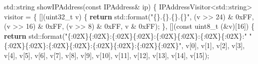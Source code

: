 \documentclass[]{article}
\newenvironment{Shaded}{}{}
\newcommand{\AttributeTok}[1]{\textcolor[rgb]{0.49,0.56,0.16}{#1}}
\newcommand{\BaseNTok}[1]{\textcolor[rgb]{0.25,0.63,0.44}{#1}}
\newcommand{\BuiltInTok}[1]{\textcolor[rgb]{0.00,0.50,0.00}{#1}}
\newcommand{\ControlFlowTok}[1]{\textcolor[rgb]{0.00,0.44,0.13}{\textbf{#1}}}
\newcommand{\DataTypeTok}[1]{\textcolor[rgb]{0.56,0.13,0.00}{#1}}
\newcommand{\DecValTok}[1]{\textcolor[rgb]{0.25,0.63,0.44}{#1}}
\newcommand{\NormalTok}[1]{#1}
\newcommand{\OperatorTok}[1]{\textcolor[rgb]{0.40,0.40,0.40}{#1}}
\newcommand{\SpecialCharTok}[1]{\textcolor[rgb]{0.25,0.44,0.63}{#1}}
\newcommand{\StringTok}[1]{\textcolor[rgb]{0.25,0.44,0.63}{#1}}
\begin{document}
\begin{Shaded}
\begin{Highlighting}[]
\BuiltInTok{std::}\NormalTok{string showIPAddress}\OperatorTok{(}\AttributeTok{const}\NormalTok{ IPAddress}\OperatorTok{\&}\NormalTok{ ip}\OperatorTok{)} \OperatorTok{\{}
\NormalTok{    IPAddressVisitor}\OperatorTok{\textless{}}\BuiltInTok{std::}\NormalTok{string}\OperatorTok{\textgreater{}}\NormalTok{ visitor }\OperatorTok{=} \OperatorTok{\{}
        \OperatorTok{[](}\DataTypeTok{uint32\_t}\NormalTok{ v}\OperatorTok{)} \OperatorTok{\{}
            \ControlFlowTok{return} \BuiltInTok{std::}\NormalTok{format}\OperatorTok{(}\StringTok{"}\SpecialCharTok{\{\}}\StringTok{.}\SpecialCharTok{\{\}}\StringTok{.}\SpecialCharTok{\{\}}\StringTok{.}\SpecialCharTok{\{\}}\StringTok{"}\OperatorTok{,}
                               \OperatorTok{(}\NormalTok{v }\OperatorTok{\textgreater{}\textgreater{}} \DecValTok{24}\OperatorTok{)} \OperatorTok{\&} \BaseNTok{0xFF}\OperatorTok{,} \OperatorTok{(}\NormalTok{v }\OperatorTok{\textgreater{}\textgreater{}} \DecValTok{16}\OperatorTok{)} \OperatorTok{\&} \BaseNTok{0xFF}\OperatorTok{,}
                               \OperatorTok{(}\NormalTok{v }\OperatorTok{\textgreater{}\textgreater{}} \DecValTok{8}\OperatorTok{)} \OperatorTok{\&} \BaseNTok{0xFF}\OperatorTok{,}\NormalTok{ v }\OperatorTok{\&} \BaseNTok{0xFF}\OperatorTok{);}
        \OperatorTok{\},}
        \OperatorTok{[](}\AttributeTok{const} \DataTypeTok{uint8\_t} \OperatorTok{(\&}\NormalTok{v}\OperatorTok{)[}\DecValTok{16}\OperatorTok{])} \OperatorTok{\{}
            \ControlFlowTok{return} \BuiltInTok{std::}\NormalTok{format}\OperatorTok{(}\StringTok{"}\SpecialCharTok{\{:02X\}\{:02X\}}\StringTok{:}\SpecialCharTok{\{:02X\}\{:02X\}}\StringTok{:}\SpecialCharTok{\{:02X\}\{:02X\}}\StringTok{:}\SpecialCharTok{\{:02X\}\{:02X\}}\StringTok{:"}
                               \StringTok{"}\SpecialCharTok{\{:02X\}\{:02X\}}\StringTok{:}\SpecialCharTok{\{:02X\}\{:02X\}}\StringTok{:}\SpecialCharTok{\{:02X\}\{:02X\}}\StringTok{:}\SpecialCharTok{\{:02X\}\{:02X\}}\StringTok{"}\OperatorTok{,}
\NormalTok{                               v}\OperatorTok{[}\DecValTok{0}\OperatorTok{],}\NormalTok{ v}\OperatorTok{[}\DecValTok{1}\OperatorTok{],}\NormalTok{ v}\OperatorTok{[}\DecValTok{2}\OperatorTok{],}\NormalTok{ v}\OperatorTok{[}\DecValTok{3}\OperatorTok{],}\NormalTok{ v}\OperatorTok{[}\DecValTok{4}\OperatorTok{],}\NormalTok{ v}\OperatorTok{[}\DecValTok{5}\OperatorTok{],}\NormalTok{ v}\OperatorTok{[}\DecValTok{6}\OperatorTok{],}\NormalTok{ v}\OperatorTok{[}\DecValTok{7}\OperatorTok{],}
\NormalTok{                               v}\OperatorTok{[}\DecValTok{8}\OperatorTok{],}\NormalTok{ v}\OperatorTok{[}\DecValTok{9}\OperatorTok{],}\NormalTok{ v}\OperatorTok{[}\DecValTok{10}\OperatorTok{],}\NormalTok{ v}\OperatorTok{[}\DecValTok{11}\OperatorTok{],}\NormalTok{ v}\OperatorTok{[}\DecValTok{12}\OperatorTok{],}\NormalTok{ v}\OperatorTok{[}\DecValTok{13}\OperatorTok{],}\NormalTok{ v}\OperatorTok{[}\DecValTok{14}\OperatorTok{],}\NormalTok{ v}\OperatorTok{[}\DecValTok{15}\OperatorTok{]);}

\end{Highlighting}
\end{Shaded}
\end{document}
